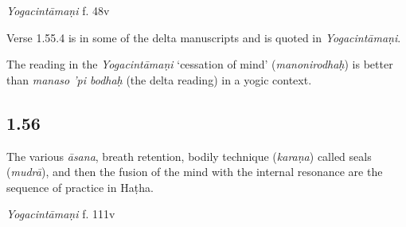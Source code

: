 \begin{ekdosis}

\begin{testimonia}[hp01_055_4]
\emph{Yogacintāmaṇi} f. 48v

\begin{versinnote}
\end{versinnote}

\end{testimonia}

\begin{philcomm}[hp01_055_4]
Verse 1.55.4 is in some of the delta manuscripts and is quoted in \emph{Yogacintāmaṇi}.

The reading in the \emph{Yogacintāmaṇi} `cessation of mind' (\emph{manonirodhaḥ}) is better than \emph{manaso 'pi bodhaḥ} (the delta reading) in a yogic context.
\end{philcomm}

\subsection*{1.56}
\begin{translation}[hp01_056]
The various \emph{āsana}, breath retention, bodily technique (\emph{karaṇa}) called seals (\emph{mudrā}), and then the fusion of the mind with the internal resonance are the sequence of practice in Haṭha.
\end{translation}

\begin{sources}[hp01_056]
\end{sources}

\begin{testimonia}[hp01_056]
\emph{Yogacintāmaṇi} f. 111v

\begin{versinnote}
\end{versinnote}

\end{testimonia}


\end{ekdosis}
